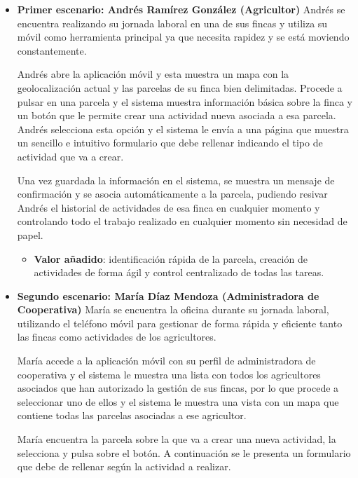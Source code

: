 \begin{itemize}
    \item \textbf{Primer escenario: Andrés Ramírez González (Agricultor)}
    \newline
    Andrés se encuentra realizando su jornada laboral en una de sus fincas y utiliza su móvil como herramienta principal 
    ya que necesita rapidez y se está moviendo constantemente.

    Andrés abre la aplicación móvil y esta muestra un mapa con la geolocalización actual y las parcelas de su finca bien
    delimitadas. Procede a pulsar en una parcela y el sistema muestra información básica sobre la finca y un botón que le
    permite crear una actividad nueva asociada a esa parcela. Andrés selecciona esta opción y el sistema le envía a una 
    página que muestra un sencillo e intuitivo formulario que debe rellenar indicando el tipo de actividad que va a crear.

    Una vez guardada la información en el sistema, se muestra un mensaje de confirmación y se asocia automáticamente a la 
    parcela, pudiendo resivar Andrés el historial de actividades de esa finca en cualquier momento y controlando todo el 
    trabajo realizado en cualquier momento sin necesidad de papel.

    \begin{itemize}
        \item \textbf{Valor añadido}: identificación rápida de la parcela, creación de actividades de forma ágil y control
        centralizado de todas las tareas.
    \end{itemize}

    \item \textbf{Segundo escenario: María Díaz Mendoza (Administradora de Cooperativa)}
    \newline
    María se encuentra la oficina durante su jornada laboral, utilizando el teléfono móvil para gestionar de forma rápida y 
    eficiente tanto las fincas como actividades de los agricultores.

    María accede a la aplicación móvil con su perfil de administradora de cooperativa y el sistema le muestra una lista con 
    todos los agricultores asociados que han autorizado la gestión de sus fincas, por lo que procede a seleccionar uno de ellos
    y el sistema le muestra una vista con un mapa que contiene todas las parcelas asociadas a ese agricultor.

    María encuentra la parcela sobre la que va a crear una nueva actividad, la selecciona y pulsa sobre el botón. A continuación
    se le presenta un formulario que debe de rellenar según la actividad a realizar.


\end{itemize}
